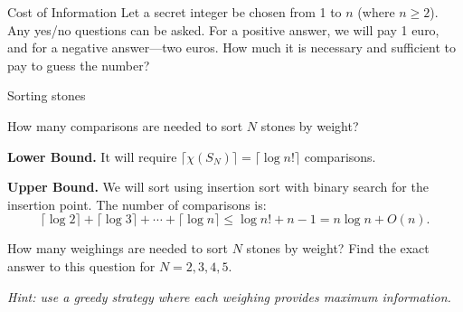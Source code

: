 \documentclass[aspectratio=169]{beamer}
\begin{document}
\begin{frame}{Cost of Information}
    Let a secret integer be chosen from 1 to \(n\) (where \(n \ge 2\)).
    Any yes/no questions can be asked. For a positive answer, we will pay 1 euro, and for a negative answer—two euros. How much it is necessary and sufficient to pay to guess the number?
\end{frame}

\begin{frame}{Sorting stones}
    \begin{example}
    How many comparisons are needed to sort \(N\) stones by weight?
    \end{example}

    \begin{solution}
    \textbf{Lower Bound.} It will require \(\lceil\chi(S_N)\rceil = \lceil\log n!\rceil\) comparisons.
    \pause\medskip

    \textbf{Upper Bound.} We will sort using insertion sort with binary search for the insertion point. The number of comparisons is:
    \[
    \lceil\log 2\rceil + \lceil\log 3\rceil + \dotsb + \lceil\log n\rceil \le \log n! + n - 1 = n\log n + O(n).
    \]
    \end{solution}

    \pause

    How many weighings are needed to sort \(N\) stones by weight?
    Find the exact answer to this question for \(N = 2, 3, 4, 5\).

    \pause
    \emph{Hint: use a greedy strategy where each weighing provides maximum information.}
\end{frame}
\end{document}
